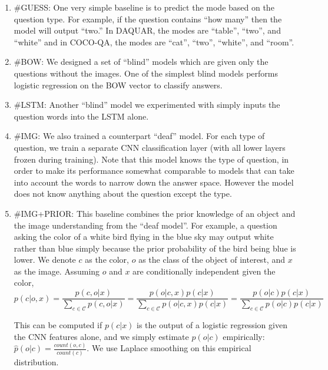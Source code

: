 \begin{enumerate}[leftmargin=*]
\item \#{GUESS}: One very simple baseline is to predict the mode based on the
question type. For example, if the question contains ``how many'' then the
model will output ``two.'' In DAQUAR, the modes are ``table'', ``two'', and
``white'' and in COCO-QA, the modes are ``cat'', ``two'', ``white'', and
``room''.

\item \#{BOW}: We designed a set of ``blind'' models which are given only the
questions without the images. One of the simplest blind models performs
logistic regression on the BOW vector to classify answers.

\item \#{LSTM}: Another ``blind'' model we experimented with simply inputs the
question words into the LSTM alone.

\item \#{IMG}: We also trained a counterpart ``deaf'' model. For each type of
question, we train a separate CNN classification layer (with all lower layers
frozen during training). Note that this model knows the type of question, in
order to make its performance somewhat comparable to models that can take
into account the words to narrow down the answer space. However the model does
not know anything about the question except the type.

\item \#{IMG+PRIOR}: This baseline combines the prior knowledge of an object
and the image understanding from the ``deaf model''. For example, a question
asking the color of a white bird flying in the blue sky may output white rather
than blue simply because the prior probability of the bird being blue is lower.
We denote $c$ as the color, $o$ as the class of the object of interest, and $x$
as the image. Assuming $o$ and $x$ are conditionally independent given the
color,
\begin{equation} 
p(c | o, x)
= \frac{p(c, o | x)}{\sum_{c \in \mathcal{C}} p(c, o | x)} 
= \frac{p(o | c, x) p(c | x)}{\sum_{c \in \mathcal{C}} p(o | c, x) p(c | x)}
= \frac{p(o | c) p(c | x)}{\sum_{c \in \mathcal{C}}p(o | c) p(c | x)}
\end{equation}

This can be computed if $p(c | x)$ is the output of a logistic regression given
the CNN features alone, and we simply estimate $p(o | c)$ empirically:
$\hat{p}(o | c) = \frac{count(o, c)}{count(c)}$. We use Laplace smoothing on
this empirical distribution.


\end{enumerate}
